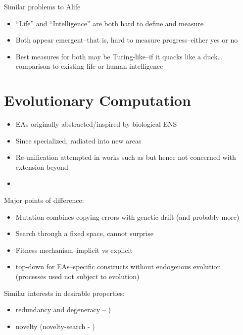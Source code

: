 Similar problems to Alife

\begin{itemize}
	\item
	      ``Life'' and ``Intelligence'' are both hard to define and measure
	\item
	      Both appear emergent--that is, hard to measure progress--either yes
	      or no
	\item
	      Best measures for both may be Turing-like--if it quacks like a
	      duck\ldots{}comparison to existing life or human intelligence
\end{itemize}

\section{Evolutionary Computation}

\begin{itemize}
	\item
	      EAs originally abstracted/inspired by biological ENS
	\item
	      Since specialized, radiated into new areas
	\item
	      Re-unification attempted in works such as \autocite{Paixao2015} but hence not concerned with extension beyond 
	\item
\end{itemize}

Major points of difference:

\begin{itemize}
	\item
	      Mutation combines copying errors with genetic drift (and probably more)
	\item
	      Search through a fixed space, cannot surprise \eg \autocite{Nellis2014}
	\item
	      Fitness mechanism--implicit vs explicit
	\item
	      top-down for EAs--specific constructs without endogenous evolution (processes used not subject to evolution)
\end{itemize}

Similar interests in desirable properties:

\begin{itemize}
	\item redundancy and degeneracy -- \autocite{Whitacre:2010qy})
	\item novelty (novelty-search - \autocite{Lehman:2008cr})
\end{itemize}
